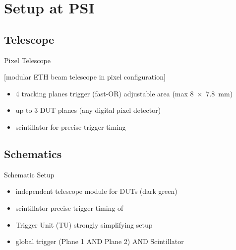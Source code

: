 \section{Setup at PSI}
\subsection{Telescope}
\begin{frame}{Pixel Telescope}

	[modular ETH beam telescope in pixel configuration]
	
	\begin{itemize}\itemfill
		\item 4 tracking planes \ra trigger (fast-OR) \ra adjustable area (max \SI{8x7.8}{\milli\meter})
		\item up to 3 DUT planes (any digital pixel detector)
		\item scintillator for precise trigger timing \ra {}
	\end{itemize}

\end{frame}
\subsection{Schematics}
\begin{frame}{Schematic Setup}

	\vspace*{-2ex}
	
	\begin{itemize}\itemfill
		\item independent telescope module for DUTs (dark green)
		\item scintillator \ra precise trigger timing of 
		\item Trigger Unit (TU) \ra strongly simplifying setup
		\item global trigger \ra (Plane 1 AND Plane 2) AND Scintillator
	\end{itemize}
	
\end{frame}
